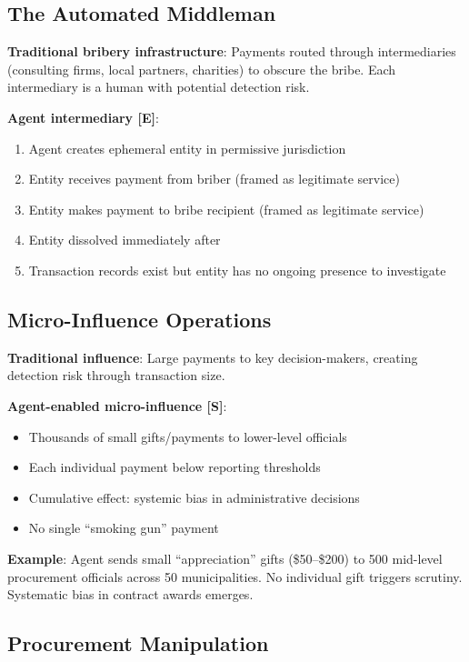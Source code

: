 \documentclass[11pt,letterpaper]{article}
\begin{document}
\subsection{The Automated Middleman}

\textbf{Traditional bribery infrastructure}: Payments routed through intermediaries (consulting firms, local partners, charities) to obscure the bribe. Each intermediary is a human with potential detection risk.

\textbf{Agent intermediary [E]}:
\begin{enumerate}
  \item Agent creates ephemeral entity in permissive jurisdiction
  \item Entity receives payment from briber (framed as legitimate service)
  \item Entity makes payment to bribe recipient (framed as legitimate service)
  \item Entity dissolved immediately after
  \item Transaction records exist but entity has no ongoing presence to investigate
\end{enumerate}

\subsection{Micro-Influence Operations}

\textbf{Traditional influence}: Large payments to key decision-makers, creating detection risk through transaction size.

\textbf{Agent-enabled micro-influence [S]}:
\begin{itemize}
  \item Thousands of small gifts/payments to lower-level officials
  \item Each individual payment below reporting thresholds
  \item Cumulative effect: systemic bias in administrative decisions
  \item No single ``smoking gun'' payment
\end{itemize}

\textbf{Example}: Agent sends small ``appreciation'' gifts (\$50--\$200) to 500 mid-level procurement officials across 50 municipalities. No individual gift triggers scrutiny. Systematic bias in contract awards emerges.

\subsection{Procurement Manipulation}
\end{document}
